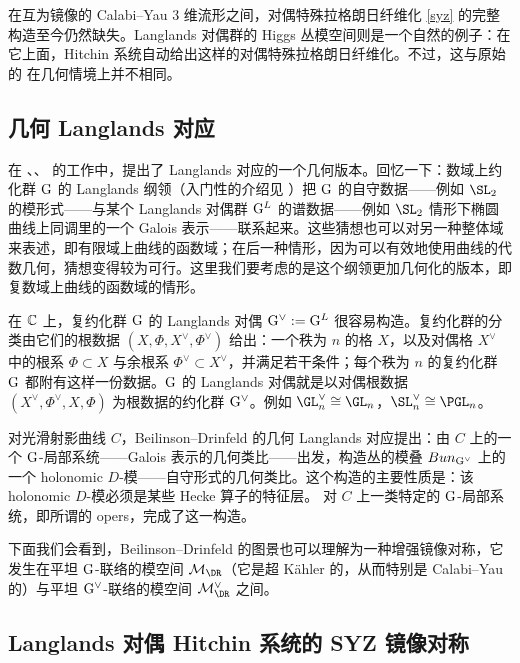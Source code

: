 在互为镜像的 Calabi--Yau $3$ 维流形之间，对偶特殊拉格朗日纤维化 \eqref{syz} 的完整构造至今仍然缺失。Langlands 对偶群的 Higgs 丛模空间则是一个自然的例子：在它上面，Hitchin 系统自动给出这样的对偶特殊拉格朗日纤维化。不过，这与原始的 \cite{strominger-etal} 在几何情境上并不相同。

\subsection{几何 Langlands 对应}

在 \cite{drinfeld1}、\cite{laumon1}、\cite{beilinson-drinfeld} 的工作中，提出了 Langlands 对应的一个几何版本。回忆一下：数域上约化群 $\mathrm{G}$ 的 Langlands 纲领（入门性的介绍见 \cite{gelbart,frenkel}）把 $\mathrm{G}$ 的自守数据——例如 $\SL_2$ 的模形式——与某个 Langlands 对偶群 $\mathrm{G}^L$ 的谱数据——例如 $\SL_2$ 情形下椭圆曲线上同调里的一个 Galois 表示——联系起来。这些猜想也可以对另一种整体域来表述，即有限域上曲线的函数域；在后一种情形，因为可以有效地使用曲线的代数几何，猜想变得较为可行。这里我们要考虑的是这个纲领更加几何化的版本，即复数域上曲线的函数域的情形。

在 $\mathbb{C}$ 上，复约化群 $\mathrm{G}$ 的 Langlands 对偶 $\mathrm{G}^\vee:=\mathrm{G}^L$ 很容易构造。复约化群的分类由它们的根数据 $(X,\Phi,X^\vee,\Phi^\vee)$ 给出：一个秩为 $n$ 的格 $X$，以及对偶格 $X^\vee$ 中的根系 $\Phi\subset X$ 与余根系 $\Phi^\vee\subset X^\vee$，并满足若干条件；每个秩为 $n$ 的复约化群 $\mathrm{G}$ 都附有这样一份数据。$\mathrm{G}$ 的 Langlands 对偶就是以对偶根数据 $(X^\vee,\Phi^\vee,X,\Phi)$ 为根数据的约化群 $\mathrm{G}^\vee$。例如 $\GL_n^\vee\cong \GL_n$，$\SL_n^\vee\cong \PGL_n$。

对光滑射影曲线 $C$，Beilinson--Drinfeld \cite{beilinson-drinfeld} 的几何 Langlands 对应提出：由 $C$ 上的一个 $\mathrm{G}$-局部系统——Galois 表示的几何类比——出发，构造丛的模叠 $Bun_{\mathrm{G}^\vee}$ 上的一个 holonomic $D$-模——自守形式的几何类比。这个构造的主要性质是：该 holonomic $D$-模必须是某些 Hecke 算子的特征层。\cite{beilinson-drinfeld} 对 $C$ 上一类特定的 $\mathrm{G}$-局部系统，即所谓的 opers，完成了这一构造。

下面我们会看到，Beilinson--Drinfeld 的图景也可以理解为一种增强镜像对称，它发生在平坦 $\mathrm{G}$-联络的模空间 $\M_\DR$（它是超 Kähler 的，从而特别是 Calabi--Yau 的）与平坦 $\mathrm{G}^\vee$-联络的模空间 $\M^\vee_{\DR}$ 之间。

\subsection{Langlands 对偶 Hitchin 系统的 SYZ 镜像对称}

